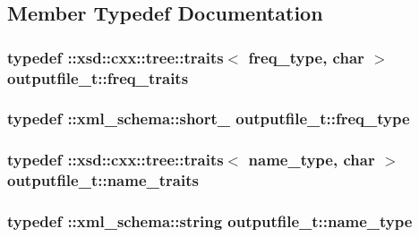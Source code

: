 \subsection{Member Typedef Documentation}
\hypertarget{classoutputfile__t_a04c223dc2992caa7119ac006c8ebe6d7}{
\subsubsection[{freq\-\_\-traits}]{\setlength{\rightskip}{0pt plus 5cm}typedef \-::xsd\-::cxx\-::tree\-::traits$<$ {\bf freq\-\_\-type}, char $>$ {\bf outputfile\-\_\-t\-::freq\-\_\-traits}}}\label{classoutputfile__t_a04c223dc2992caa7119ac006c8ebe6d7}
\hypertarget{classoutputfile__t_a6a45c7bbd6bb78b02c32b155fdc19dda}{
\subsubsection[{freq\-\_\-type}]{\setlength{\rightskip}{0pt plus 5cm}typedef \-::{\bf xml\-\_\-schema\-::short\-\_\-} {\bf outputfile\-\_\-t\-::freq\-\_\-type}}}\label{classoutputfile__t_a6a45c7bbd6bb78b02c32b155fdc19dda}
\hypertarget{classoutputfile__t_a8282992129b5444c95e512f7c538c1c4}{
\subsubsection[{name\-\_\-traits}]{\setlength{\rightskip}{0pt plus 5cm}typedef \-::xsd\-::cxx\-::tree\-::traits$<$ {\bf name\-\_\-type}, char $>$ {\bf outputfile\-\_\-t\-::name\-\_\-traits}}}\label{classoutputfile__t_a8282992129b5444c95e512f7c538c1c4}
\hypertarget{classoutputfile__t_a9207f2bca21ee3d91246fae00c13d24b}{
\subsubsection[{name\-\_\-type}]{\setlength{\rightskip}{0pt plus 5cm}typedef \-::{\bf xml\-\_\-schema\-::string} {\bf outputfile\-\_\-t\-::name\-\_\-type}}}\label{classoutputfile__t_a9207f2bca21ee3d91246fae00c13d24b}


